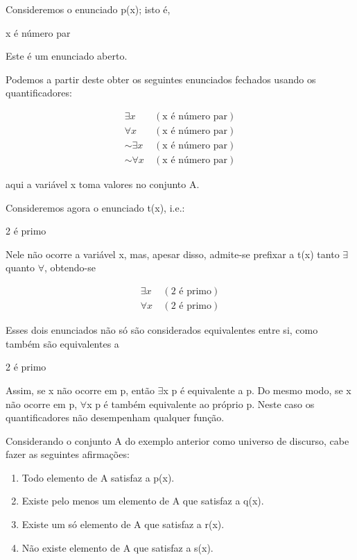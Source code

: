 \noindent Consideremos o enunciado p(x); isto é,

\centerline{x é número par}

\noindent Este é um enunciado aberto.

Podemos a partir deste obter os seguintes enunciados fechados usando os quantificadores:

\begin{align*}
    \exists x\ & (\text{x é número par}) \\
    \forall x\ & (\text{x é número par}) \\
    \sim \exists x\ & (\text{x é número par}) \\
    \sim \forall x\ & (\text{x é número par})
\end{align*}

aqui a variável x toma valores no conjunto A.

\noindent Consideremos agora o enunciado t(x), i.e.:

\centerline{2 é primo}

\noindent Nele não ocorre a variável x, mas, apesar disso, admite-se prefixar a t(x) tanto $\exists$ quanto $\forall$, obtendo-se

\begin{align*}
    \exists x\ & (\text{2 é primo}) \\
    \forall x\ & (\text{2 é primo})
\end{align*}

\noindent Esses dois enunciados não só são considerados equivalentes entre si, como também são equivalentes a

\centerline{2 é primo}

Assim, se x não ocorre em p, então $\exists$x p é equivalente a p.
Do mesmo modo, se x não ocorre em p, $\forall$x p é também equivalente ao próprio p.
Neste caso os quantificadores não desempenham qualquer função.

Considerando o conjunto A do exemplo anterior como universo de discurso, cabe fazer as seguintes afirmações:

\begin{enumerate}[label=(\roman*)]
    \item Todo elemento de A satisfaz a p(x).
    \item Existe pelo menos um elemento de A que satisfaz a q(x).
    \item Existe um só elemento de A que satisfaz a r(x).
    \item Não existe elemento de A que satisfaz a s(x).
\end{enumerate}

